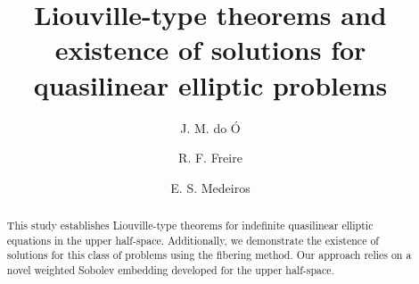 \documentclass[12pt,reqno]{amsart}
\begin{document}
	\title[Liouville theorems and existence for quasilinear elliptic problems]{Liouville-type theorems and existence of solutions for quasilinear elliptic problems}
	
	\author[J. M.\ do \'O]{J. M. do \'O}
	\address[J. M.\ do \'O]{Department of Mathematics,
		Federal University of Para\'{\i}ba
		\newline{}-900, Jo\~ao Pessoa-PB, Brazil}
	
	\author[Freire]{R. F. Freire}
	\address[R. F. Freire]{Department of Mathematics,
		Federal University of Para\'{\i}ba
		\newline{}-900, Jo\~ao Pessoa-PB, Brazil}
	
	\author[Medeiros]{E. S. Medeiros}
	\address[E. S. Medeiros]{Department of Mathematics,
		Federal University of Para\'{\i}ba
		\newline{}-900, Jo\~ao Pessoa-PB, Brazil}
 		
	
	
	
	
	
\begin{abstract} 
This study establishes Liouville-type theorems for indefinite quasilinear elliptic equations in the upper half-space. Additionally, we demonstrate the existence of solutions for this class of problems using the fibering method. Our approach relies on a novel weighted Sobolev embedding developed for the upper half-space.
\end{abstract}

\maketitle
  

	
	
\end{document}
